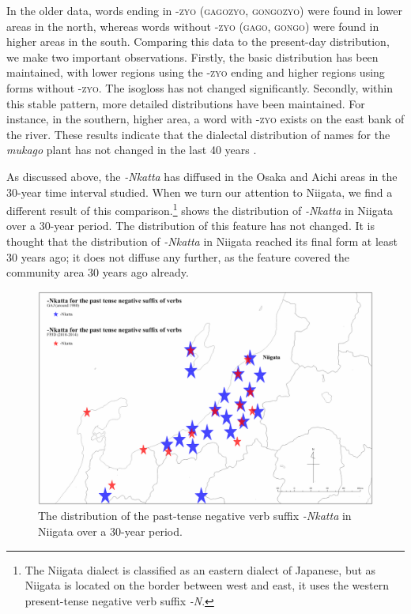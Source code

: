 \documentclass[output=paper]{LSP/langsci}
\begin{document}
In the older data, words ending in \textsc{-zyo} (\textsc{gagozyo}, \textsc{gongozyo}) were found in lower areas in the north, whereas words without \textsc{-zyo} (\textsc{gago}, \textsc{gongo}) were found in higher areas in the south. Comparing this data to the present-day distribution, we make two important observations. Firstly, the basic distribution has been maintained, with lower regions using the \textsc{-zyo} ending and higher regions using forms without \textsc{-zyo}. The isogloss has not changed significantly. Secondly, within this stable pattern, more detailed distributions have been maintained. For instance, in the southern, higher area, a word with \textsc{-zyo} exists on the east bank of the river. These results indicate that the dialectal distribution of names for the \textit{mukago} plant has not changed in the last 40 years \citep{onishi_relationship_inprint}.

As discussed above, the  \textit{-Nkatta} has diffused in the Osaka and Aichi areas in the 30-year time interval studied. When we turn our attention to Niigata, we find a different result of this  comparison.\footnote{ The Niigata dialect is classified as an eastern dialect of Japanese, but as Niigata is located on the border between west and east, it uses the western present-tense negative verb suffix \textit{-N}.}  shows the distribution of \textit{-Nkatta} in Niigata over a 30-year period. The distribution of this feature has not changed. It is thought that the distribution of \textit{-Nkatta} in Niigata reached its final form at least 30 years ago; it does not diffuse any further, as the feature covered the community area 30 years ago already.



\begin{figure}[t]
\includegraphics[width=\textwidth]{illustrations/onishi_fig8}
\caption{The distribution of the past-tense negative verb suffix \textit{-Nkatta} in Niigata over a 30-year period.}
\label{fig:8}
\end{figure}
\end{document}
